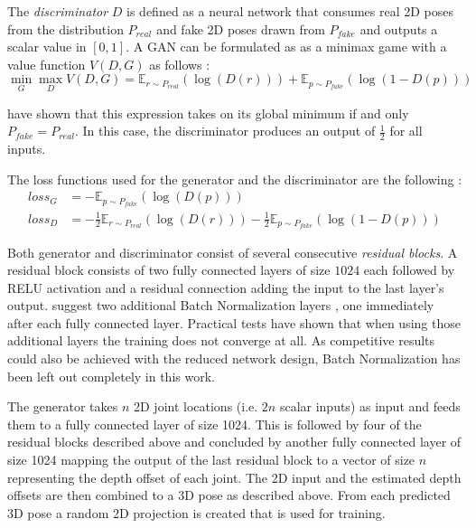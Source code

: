 The \textit{discriminator} $D$ is defined as a neural network that consumes real 2D poses from the distribution $P_{real}$ and fake 2D poses drawn from $P_{fake}$ and outputs a scalar value in $[0, 1]$.
A GAN can be formulated as as a minimax game with a value function $V(D, G)$ as follows \cite{goodfellow14}: 
\begin{equation}
	\min_G \max_D V(D, G) = \mathbb{E}_{r\sim P_{real}}(\log(D(r))) + \mathbb{E}_{p\sim P_{fake}}(\log(1 - D(p)))
\end{equation}

\citet{goodfellow14} have shown that this expression takes on its global minimum if and only $P_{fake} = P_{real}$.
In this case, the discriminator produces an output of $\frac{1}{2}$ for all inputs.

The loss functions used for the generator and the discriminator are the following \cite{goodfellow17}:
\begin{align}
	\label{eq:generator-loss}
	loss_G &= -\mathbb{E}_{p\sim P_{fake}}(\log(D(p))) \\
	\label{eq:discriminator-loss}
	loss_D &= -\frac{1}{2}\mathbb{E}_{r\sim P_{real}}(\log(D(r))) - \frac{1}{2} \mathbb{E}_{p\sim P_{fake}}(\log(1 - D(p)))
\end{align}


Both generator and discriminator consist of several consecutive \textit{residual blocks}.
A residual block consists of two fully connected layers of size $1024$ each followed by RELU activation and a residual connection adding the input to the last layer's output.
\citet{drover18} suggest two additional Batch Normalization layers \cite{ioffe15}, one immediately after each fully connected layer.
Practical tests have shown that when using those additional layers the training does not converge at all.
As competitive results could also be achieved with the reduced network design, Batch Normalization has been left out completely in this work.

The generator takes $n$ 2D joint locations (i.e. $2n$ scalar inputs) as input and feeds them to a fully connected layer of size 1024.
This is followed by four of the residual blocks described above and concluded by another fully connected layer of size 1024 mapping the output of the last residual block to a vector of size $n$ representing the depth offset of each joint.
The 2D input and the estimated depth offsets are then combined to a 3D pose as described above.
From each predicted 3D pose a random 2D projection is created that is used for training.

